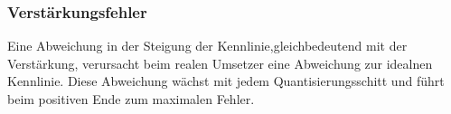 \subsubsection{Verstärkungsfehler}
Eine Abweichung in der Steigung der
Kennlinie,gleichbedeutend mit der Verstärkung, verursacht beim realen Umsetzer eine Abweichung zur idealnen
Kennlinie. Diese Abweichung wächst mit jedem Quantisierungsschitt und führt beim
positiven Ende zum maximalen Fehler.
\begin{figure}[!ht]
\begin{center}
\end{center}
\end{figure}

